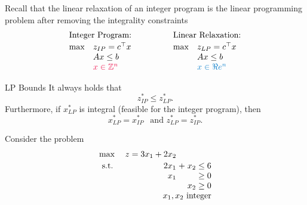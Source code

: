 Recall that the linear relaxation of an integer program is the linear programming problem after removing the integrality constraints
\[
\begin{array}{ll}
\multicolumn{2}{l}{\text{Integer Program:}}\\[2pt]
\max & z_{IP} = c^\top x \\
     & Ax \leq b \\
     & \tred{x \in \Z^n}
\end{array}
\qquad\qquad
\begin{array}{ll}
\multicolumn{2}{l}{\text{Linear Relaxation:}}\\[2pt]
\max & z_{LP} = c^\top x \\
     & Ax \leq b \\
     & \tblue{x \in \R^n}
\end{array}
\]

\begin{theorem}{LP Bounds}{}
It always holds that 
\begin{equation}
z^*_{IP} \leq z^*_{LP}.
\end{equation}
Furthermore, if $x^*_{LP}$ is integral (feasible for the integer program), then 
\begin{equation}
x^*_{LP} = x^*_{IP} \ \ \text{ and } z^*_{LP} = z^*_{IP}.
\end{equation}
\end{theorem}

\begin{example}{}{}

\begin{minipage}[t]{0.1\textwidth}
\end{minipage}
%
\begin{minipage}[t]{0.5\textwidth}
Consider the problem 
\[
\begin{array}{l r@{\;}c@{\;}r@{\;}c@{\;}r}
\max & z = 3x_1 + 2x_2 & & & & \\[2pt]
\st  & 2x_1 & + & x_2 & \leq & 6 \\
     & x_1  &   &     & \geq & 0 \\
     &      &   & x_2 & \geq & 0 \\
     & \multicolumn{5}{r}{x_1, x_2 \text{ integer}}
\end{array}
\]
\end{minipage}
%
\begin{minipage}[t]{0.4\textwidth}
\end{minipage}
\end{example}

